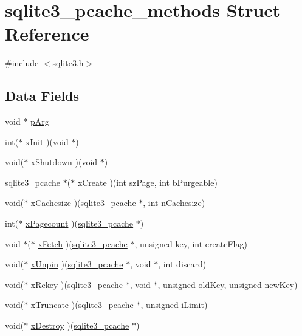 \hypertarget{structsqlite3__pcache__methods}{}\section{sqlite3\+\_\+pcache\+\_\+methods Struct Reference}
\label{structsqlite3__pcache__methods}


{\ttfamily \#include $<$sqlite3.\+h$>$}

\subsection*{Data Fields}
\begin{DoxyCompactItemize}
\item 
void $\ast$ \hyperlink{structsqlite3__pcache__methods_a3717fa60d029e21cf1253154e5bdd969}{p\+Arg}
\item 
int($\ast$ \hyperlink{structsqlite3__pcache__methods_a707c4748dcafc75384a806d13bb68bdd}{x\+Init} )(void $\ast$)
\item 
void($\ast$ \hyperlink{structsqlite3__pcache__methods_a34a88425495f42099aadbe3fa9676a06}{x\+Shutdown} )(void $\ast$)
\item 
\hyperlink{sqlite3_8c_a096c453d937d51f7926d7d31c8e0bd2f}{sqlite3\+\_\+pcache} $\ast$($\ast$ \hyperlink{structsqlite3__pcache__methods_a8eeedccf480e19867d82b11b5b59cc69}{x\+Create} )(int sz\+Page, int b\+Purgeable)
\item 
void($\ast$ \hyperlink{structsqlite3__pcache__methods_a1a71e7cecb9abff1fcc9594e0120091b}{x\+Cachesize} )(\hyperlink{sqlite3_8c_a096c453d937d51f7926d7d31c8e0bd2f}{sqlite3\+\_\+pcache} $\ast$, int n\+Cachesize)
\item 
int($\ast$ \hyperlink{structsqlite3__pcache__methods_a2b94d01bdb0e2496c486b48a37a00fea}{x\+Pagecount} )(\hyperlink{sqlite3_8c_a096c453d937d51f7926d7d31c8e0bd2f}{sqlite3\+\_\+pcache} $\ast$)
\item 
void $\ast$($\ast$ \hyperlink{structsqlite3__pcache__methods_a966011a4866c4856abe14aa532ce4098}{x\+Fetch} )(\hyperlink{sqlite3_8c_a096c453d937d51f7926d7d31c8e0bd2f}{sqlite3\+\_\+pcache} $\ast$, unsigned key, int create\+Flag)
\item 
void($\ast$ \hyperlink{structsqlite3__pcache__methods_a0179cdf335a93eb2be5b94a6c2754a94}{x\+Unpin} )(\hyperlink{sqlite3_8c_a096c453d937d51f7926d7d31c8e0bd2f}{sqlite3\+\_\+pcache} $\ast$, void $\ast$, int discard)
\item 
void($\ast$ \hyperlink{structsqlite3__pcache__methods_a58ac2c2bfa7cc9811e46368ea0ea73f7}{x\+Rekey} )(\hyperlink{sqlite3_8c_a096c453d937d51f7926d7d31c8e0bd2f}{sqlite3\+\_\+pcache} $\ast$, void $\ast$, unsigned old\+Key, unsigned new\+Key)
\item 
void($\ast$ \hyperlink{structsqlite3__pcache__methods_a1c61888ab80e7d81e2815f0fea2d87a0}{x\+Truncate} )(\hyperlink{sqlite3_8c_a096c453d937d51f7926d7d31c8e0bd2f}{sqlite3\+\_\+pcache} $\ast$, unsigned i\+Limit)
\item 
void($\ast$ \hyperlink{structsqlite3__pcache__methods_ac818e6091765fe201ab5727d515141a7}{x\+Destroy} )(\hyperlink{sqlite3_8c_a096c453d937d51f7926d7d31c8e0bd2f}{sqlite3\+\_\+pcache} $\ast$)
\end{DoxyCompactItemize}


